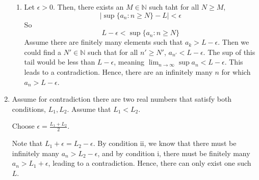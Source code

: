 \documentclass[12pt]{article}
\begin{document}
\begin{enumerate}[start=1,label={\bfseries Problem \arabic*:},leftmargin=1in]
\begin{enumerate}
        \item Let $\epsilon > 0$. Then, there exists an $M \in \mathbb{N}$ such taht for all $N \geq M$, 
        \[ 
            \left| \sup \{ a_{n} : n \geq N \} - L \right| < \epsilon
        \]
        So 
        \[
            L - \epsilon < \sup \{ a_{n} : n \geq N \} 
        \]
        Assume there are finitely many elements such that $a_{k} > L -\epsilon$. 
        Then we could find a $N' \in \mathbb{N}$ such that for all $n' \geq N'$, $a_{n'} < L - \epsilon$. The sup of this tail would be less than $L - \epsilon$, meaning $\lim_{n \to \infty} \sup a_{n} < L - \epsilon$. 
        This leads to a contradiction. Hence, there are an infinitely many $n$ for which $a_{n} > L - \epsilon$. 
    \end{enumerate}

    \item Assume for contradiction there are two real numbers that satisfy both conditions, $L_{1}, L_{2}$. 
    Assume that $L_{1} < L_{2}$. 

    Choose $\epsilon = \frac{L_{1} + L_{2}}{2}$. 

    Note that $L_{1} + \epsilon = L_{2} - \epsilon$. 
    By condition ii, we know that there must be infinitely many $a_{n} > L_{2} - \epsilon$, and by condition i, there must be finitely many $a_{n} > L_{1} + \epsilon$, leading to a contradiction. 
    Hence, there can only exist one such $L$. 
\end{enumerate}
\end{document}
